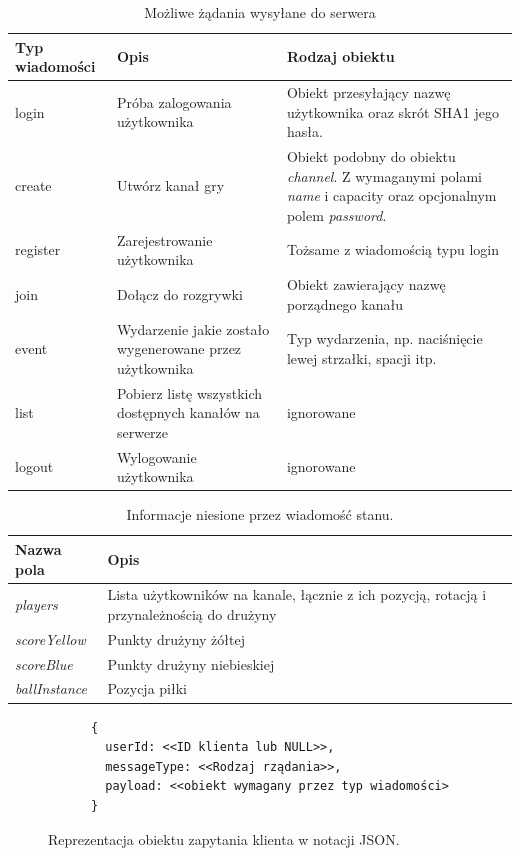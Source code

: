\begin{table}[h]
  \centering
  \begin{tabular}{ |p{1.5cm}|p{6cm}|p{6cm}| }
    \hline
    \textbf{Typ wiadomości} & \textbf{Opis} & \textbf{Rodzaj obiektu} \\ \hline
    login & Próba zalogowania użytkownika & Obiekt przesyłający nazwę użytkownika oraz skrót SHA1 jego hasła. \\
    create & Utwórz kanał gry & Obiekt podobny do obiektu \emph{channel}. Z wymaganymi polami \emph{name} i {capacity} oraz opcjonalnym polem \emph{password}. \\
    register & Zarejestrowanie użytkownika & Tożsame z wiadomością typu login \\
    join & Dołącz do rozgrywki & Obiekt zawierający nazwę porządnego kanału \\
    event & Wydarzenie jakie zostało wygenerowane przez użytkownika & Typ wydarzenia, np. naciśnięcie lewej strzałki, spacji itp. \\
    list & Pobierz listę wszystkich dostępnych kanałów na serwerze & ignorowane \\
    logout & Wylogowanie użytkownika & ignorowane \\
    \hline
  \end{tabular}
  \caption{Możliwe żądania wysyłane do serwera}
  \label{tab:clientmessagestypes}
\end{table}
\begin{table}[ht]
  \centering
  \begin{tabular}{ |p{3cm}|p{8cm}| }
    \hline
    \textbf{Nazwa pola} & \textbf{Opis} \\ \hline
    \emph{players} & Lista użytkowników na kanale, łącznie z ich pozycją, rotacją i przynależnością do drużyny \\
    \emph{scoreYellow} & Punkty drużyny żółtej \\
    \emph{scoreBlue} & Punkty drużyny niebieskiej \\
    \emph{ballInstance} & Pozycja piłki \\
    \hline
  \end{tabular}
  \caption{Informacje niesione przez wiadomość stanu.}
  \label{tab:state-fields}
\end{table}
\begin{figure}[ht]
    \centering
    \begin{verbatim}
      {
        userId: <<ID klienta lub NULL>>,
        messageType: <<Rodzaj rządania>>,
        payload: <<obiekt wymagany przez typ wiadomości>
      }
      \end{verbatim}
    \caption{Reprezentacja obiektu zapytania klienta w notacji JSON.}
    \label{fig:jsonclient}
\end{figure}
\clearpage
